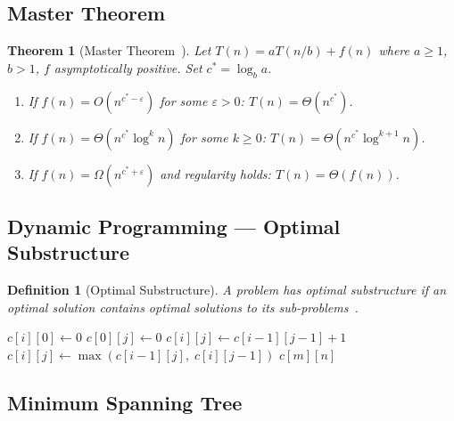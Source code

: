 \documentclass[12pt,a4paper]{article}
\newtheorem{theorem}{Theorem}[section]
\newtheorem{definition}{Definition}[section]
\begin{document}
\subsection{Master Theorem}

\begin{theorem}[Master Theorem~\cite{cormen2022}]
Let $T(n) = aT(n/b) + f(n)$ where $a \geq 1$, $b > 1$, $f$ asymptotically positive.
Set $c^* = \log_b a$.
\begin{enumerate}[label=\textbf{Case \arabic*:}]
  \item If $f(n) = O(n^{c^*-\varepsilon})$ for some $\varepsilon > 0$:
        $T(n) = \Theta(n^{c^*})$.
  \item If $f(n) = \Theta(n^{c^*}\log^k n)$ for some $k \geq 0$:
        $T(n) = \Theta(n^{c^*}\log^{k+1} n)$.
  \item If $f(n) = \Omega(n^{c^*+\varepsilon})$ and regularity holds:
        $T(n) = \Theta(f(n))$.
\end{enumerate}
\end{theorem}

\subsection{Dynamic Programming — Optimal Substructure}

\begin{definition}[Optimal Substructure]
A problem has \emph{optimal substructure} if an optimal solution contains
optimal solutions to its sub-problems~\cite{cormen2022}.
\end{definition}

\begin{algorithm}
\caption{Longest Common Subsequence (LCS)}
\begin{algorithmic}[1]
   $c[i][0] \leftarrow 0$ \EndFor
   $c[0][j] \leftarrow 0$ \EndFor
        \State $c[i][j] \leftarrow c[i-1][j-1] + 1$
      \Else
        \State $c[i][j] \leftarrow \max(c[i-1][j],\; c[i][j-1])$
      \EndIf
    \EndFor
  \EndFor
  \Return $c[m][n]$
\EndProcedure
\end{algorithmic}
\end{algorithm}

\subsection{Minimum Spanning Tree}
\end{document}
